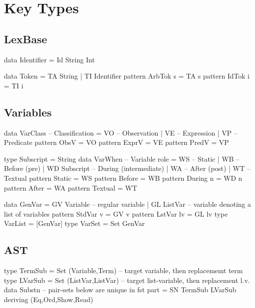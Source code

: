 \section{Key Types}

\subsection{LexBase}

\begin{code}
data Identifier = Id String Int
\end{code}

\begin{code}
data Token
 = TA String
 | TI Identifier
pattern ArbTok s = TA s
pattern IdTok i = TI i
\end{code}

\subsection{Variables}

\begin{code}
data VarClass -- Classification
  = VO -- Observation
  | VE -- Expression
  | VP -- Predicate
pattern ObsV  = VO
pattern ExprV = VE
pattern PredV = VP
\end{code}

\begin{code}
type Subscript = String
data VarWhen -- Variable role
  = WS            --  Static
  | WB            --  Before (pre)
  | WD Subscript  --  During (intermediate)
  | WA            --  After (post)
  | WT            --  Textual
pattern Static    =  WS
pattern Before    =  WB
pattern During n  =  WD n
pattern After     =  WA
pattern Textual   =  WT
\end{code}

\begin{code}
data GenVar
 = GV Variable -- regular variable
 | GL ListVar  -- variable denoting a list of variables
pattern StdVar v = GV v
pattern LstVar lv = GL lv
type VarList = [GenVar]
type VarSet = Set GenVar
\end{code}

\newpage
\subsection{AST}

\begin{code}
type TermSub = Set (Variable,Term) -- target variable, then replacememt term
type LVarSub = Set (ListVar,ListVar) -- target list-variable, then replacement l.v.
data Substn --  pair-sets below are unique in fst part
  = SN TermSub LVarSub
  deriving (Eq,Ord,Show,Read)
\end{code}

